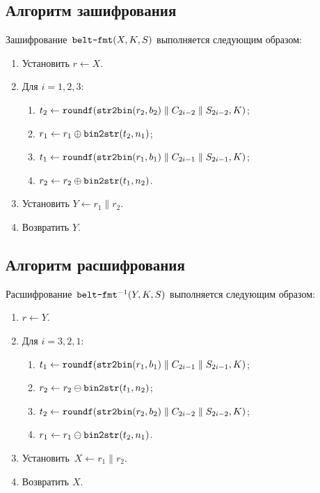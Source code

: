 \subsection{Алгоритм зашифрования}

Зашифрование~$\texttt{belt-fmt}(X,K,S)$ выполняется следующим образом:
\begin{enumerate}
\item
Установить $r\leftarrow X$.
\item
Для $i=1,2,3$:
\begin{enumerate}
\item
$t_2\leftarrow
\texttt{roundf}(\texttt{str2bin}(r_2,b_2)\parallel C_{2i-2}\parallel S_{2i-2},K)$;
\item
$r_1\leftarrow r_1\oplus\texttt{bin2str}(t_2,n_1)$;
\item
$t_1\leftarrow 
\texttt{roundf}(\texttt{str2bin}(r_1,b_1)\parallel C_{2i-1}\parallel S_{2i-1},K)$; 
\item
$r_2\leftarrow r_2\oplus\texttt{bin2str}(t_1,n_2)$.
\end{enumerate}
\item
Установить $Y\leftarrow r_1\parallel r_2$.
\item
Возвратить $Y$.
\end{enumerate}

\subsection{Алгоритм расшифрования}

Расшифрование~$\texttt{belt-fmt}^{-1}(Y,K,S)$ выполняется следующим образом:
\begin{enumerate}
\item
$r\leftarrow Y$.
\item
Для $i=3,2,1$:
\begin{enumerate}
\item
$t_1\leftarrow 
\texttt{roundf}(\texttt{str2bin}(r_1,b_1)\parallel C_{2i-1}\parallel S_{2i-1},K)$;
\item
$r_2\leftarrow r_2\ominus \texttt{bin2str}(t_1,n_2)$;
\item
$t_2\leftarrow 
\texttt{roundf}(\texttt{str2bin}(r_2,b_2)\parallel C_{2i-2}\parallel S_{2i-2},K)$;
\item
$r_1\leftarrow r_1\ominus \texttt{bin2str}(t_2,n_1)$.
\end{enumerate}
\item
Установить~$X\leftarrow r_1\parallel r_2$.
\item
Возвратить $X$.
\end{enumerate}

